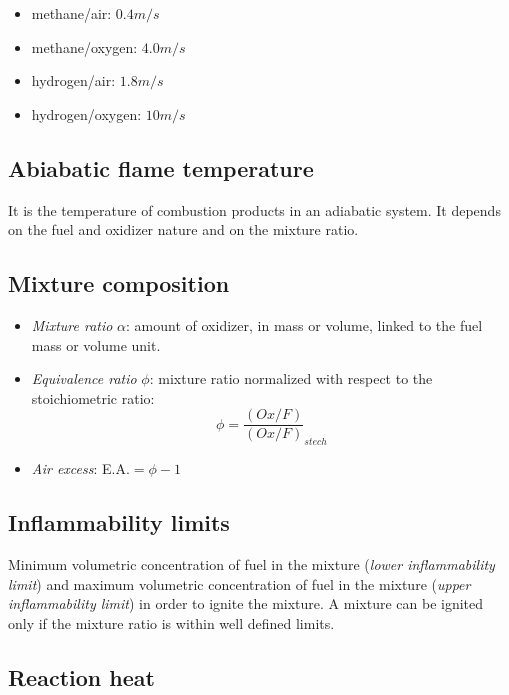\documentclass[12pt]{article}
\begin{document}
\begin{itemize}
    \item methane/air: $0.4 m/s$
    \item methane/oxygen: $4.0 m/s$
    \item hydrogen/air: $1.8 m/s$
    \item hydrogen/oxygen: $10 m/s$
\end{itemize}

\subsection{Abiabatic flame temperature}

It is the temperature of combustion products in an adiabatic system. It depends on the fuel and oxidizer nature and on the mixture ratio.

\subsection{Mixture composition}

\begin{itemize}
    \item \textit{Mixture ratio} $\alpha$: amount of oxidizer, in mass or volume, linked to the fuel mass or volume unit.
    \item \textit{Equivalence ratio} $\phi$: mixture ratio normalized with respect to the stoichiometric ratio:
    \begin{equation}
        \phi = \frac{(Ox/F)}{(Ox/F)}_{stech}
    \end{equation}
    \item \textit{Air excess}: E.A.$=\phi-1$
\end{itemize}

\subsection{Inflammability limits}

Minimum volumetric concentration of fuel in the mixture (\textit{lower inflammability limit}) and maximum volumetric concentration of fuel in the mixture (\textit{upper inflammability limit}) in order to ignite the mixture. A mixture can be ignited only if the mixture ratio is within well defined limits.

\subsection{Reaction heat}
\end{document}
